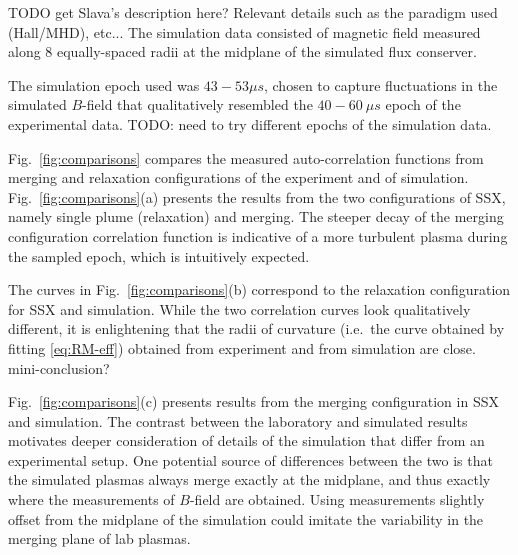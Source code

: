 \documentclass[aip,prl,amsmath,amssymb,reprint,superscriptaddress]{revtex4-1} %
\begin{document}
\textsf{TODO get Slava's description here? Relevant details such as the paradigm used (Hall/MHD), etc...}
The simulation data consisted of magnetic field measured along 8 equally-spaced radii at the midplane of the simulated flux conserver. 

The simulation epoch used was $43-53 \mu s$, chosen to capture fluctuations in the simulated $B$-field that qualitatively resembled the $40-60\ \mu s$ epoch of the experimental data. \textsf{TODO: need to try different epochs of the simulation data.}

Fig.\ \ref{fig:comparisons} compares the measured auto-correlation functions from merging and relaxation configurations of the experiment and of simulation. Fig.\ \ref{fig:comparisons}(a) presents the results from the two configurations of SSX, namely single plume (relaxation) and merging. The steeper decay of the merging configuration correlation function is indicative of a more turbulent plasma during the sampled epoch, which is intuitively expected.

The curves in Fig.\ \ref{fig:comparisons}(b) correspond to the relaxation configuration for SSX and simulation. 
While the two correlation curves look qualitatively different, it is enlightening that the radii of curvature (i.e.\ the curve obtained by fitting \eqref{eq:RM-eff}) obtained from experiment and from simulation are close. \textsf{mini-conclusion?} 

Fig.\ \ref{fig:comparisons}(c) presents results from the merging configuration in SSX and simulation. 
The contrast between the laboratory and simulated results motivates deeper consideration of details of the simulation that differ from an experimental setup. One potential source of differences between the two is that the simulated plasmas always merge exactly at the midplane, and thus exactly where the measurements of $B$-field are obtained. Using measurements slightly offset from the midplane of the simulation could imitate the variability in the merging plane of lab plasmas.
\end{document}
